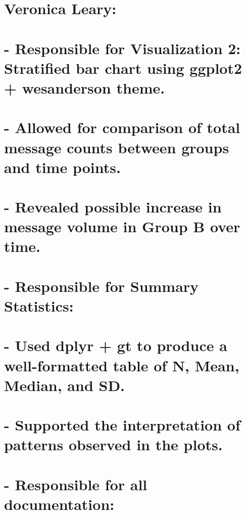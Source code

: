 \documentclass[
]{article}
\begin{document}
\section{Veronica Leary:}\label{veronica-leary}

\section{- Responsible for Visualization 2: Stratified bar chart using
ggplot2 + wesanderson
theme.}\label{responsible-for-visualization-2-stratified-bar-chart-using-ggplot2-wesanderson-theme.}

\section{- Allowed for comparison of total message counts between groups
and time
points.}\label{allowed-for-comparison-of-total-message-counts-between-groups-and-time-points.}

\section{- Revealed possible increase in message volume in Group B over
time.}\label{revealed-possible-increase-in-message-volume-in-group-b-over-time.}

\section{- Responsible for Summary
Statistics:}\label{responsible-for-summary-statistics}

\section{- Used dplyr + gt to produce a well-formatted table of N, Mean,
Median, and
SD.}\label{used-dplyr-gt-to-produce-a-well-formatted-table-of-n-mean-median-and-sd.}

\section{- Supported the interpretation of patterns observed in the
plots.}\label{supported-the-interpretation-of-patterns-observed-in-the-plots.}

\section{- Responsible for all
documentation:}\label{responsible-for-all-documentation}
\end{document}
